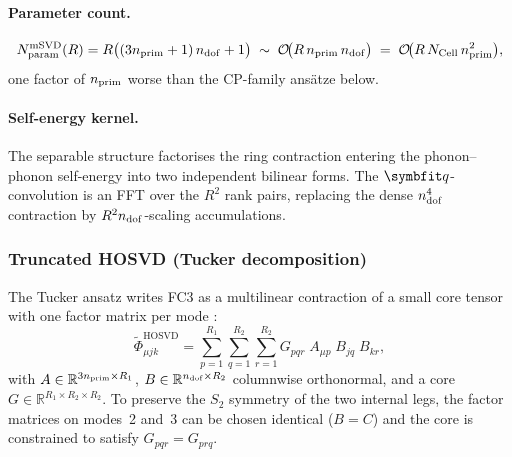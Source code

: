\paragraph{Parameter count.}
\begin{equation}\label{eq:fc3_matsvd_params}
  N_{\mathrm{param}}^{\mathrm{mSVD}}(R)
  = R\bigl((3n_{\mathrm{prim}}+1)\,n_{\mathrm{dof}} + 1\bigr)
  \;\sim\; \mathcal{O}\!\bigl(R\,n_{\mathrm{prim}}\,n_{\mathrm{dof}}\bigr)
  \;=\; \mathcal{O}\!\bigl(R\,N_{\mathrm{Cell}}\,n_{\mathrm{prim}}^{2}\bigr),
\end{equation}
one factor of $n_{\mathrm{prim}}$ worse than the CP-family ans\"atze below.

\paragraph{Self-energy kernel.} The separable structure factorises the ring contraction entering
the phonon--phonon self-energy into two independent bilinear forms. The $\vq$-convolution is an
FFT over the $R^{2}$ rank pairs, replacing the dense $n_{\mathrm{dof}}^{4}$ contraction by
$R^{2}n_{\mathrm{dof}}$-scaling accumulations.

\subsubsection{Truncated HOSVD (Tucker decomposition)}
\label{sub:fc3_tucker}
The Tucker ansatz writes FC3 as a multilinear contraction of a small core tensor with one factor
matrix per mode \cite{tucker_mathematical_1966, kolda_tensor_2009}:
\begin{equation}\label{eq:fc3_tucker_ansatz}
    \tilde\Phi_{\mu j k}^{\mathrm{HOSVD}}
    = \sum_{p=1}^{R_1}\sum_{q=1}^{R_2}\sum_{r=1}^{R_2}
      G_{p q r}\; A_{\mu p}\; B_{j q}\; B_{k r},
\end{equation}
with $A\in\mathbb{R}^{3n_{\mathrm{prim}}\times R_1}$, $B\in\mathbb{R}^{n_{\mathrm{dof}}\times R_2}$ columnwise
orthonormal, and a core $G\in\mathbb{R}^{R_1\times R_2\times R_2}$. To preserve the $S_2$
symmetry of the two internal legs, the factor matrices on modes~2 and~3 can be chosen identical ($B=C$)
and the core is constrained to satisfy $G_{pqr}=G_{prq}$.

